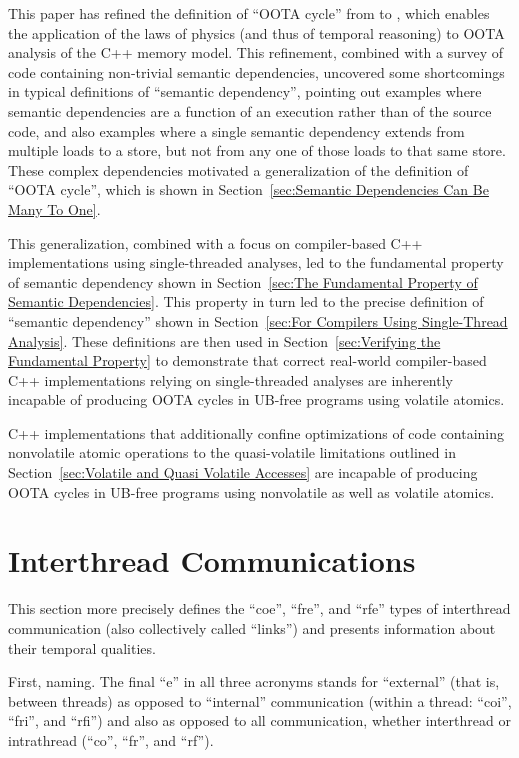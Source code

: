 \documentclass[10]{article}
\begin{document}
This paper has refined the definition of ``OOTA cycle'' from
 to , which enables the
application of the laws of physics (and thus of temporal reasoning) to OOTA
analysis of the C++ memory model.
This refinement, combined with a survey of code containing non-trivial
semantic dependencies, uncovered some shortcomings in typical definitions of
``semantic dependency'', pointing out examples where semantic dependencies
are a function of an execution rather than of the source code, and also
examples where a single semantic dependency extends from multiple loads
to a store, but not from any one of those loads to that same store.
These complex dependencies motivated a generalization of the definition
of ``OOTA cycle'', which is shown in
Section~\ref{sec:Semantic Dependencies Can Be Many To One}.

This generalization, combined with a focus on compiler-based C++
implementations using single-threaded analyses, led to the fundamental
property of semantic dependency shown in
Section~\ref{sec:The Fundamental Property of Semantic Dependencies}.
This property in turn led to the precise definition of ``semantic
dependency'' shown in
Section~\ref{sec:For Compilers Using Single-Thread Analysis}.
These definitions are then used in
Section~\ref{sec:Verifying the Fundamental Property}
to demonstrate that correct real-world compiler-based C++
implementations relying on single-threaded analyses are inherently
incapable of producing OOTA cycles in UB-free programs using volatile
atomics.

C++ implementations that additionally confine optimizations of code
containing nonvolatile atomic operations to the quasi-volatile limitations
outlined in
Section~\ref{sec:Volatile and Quasi Volatile Accesses}
are incapable of producing OOTA cycles in UB-free programs using
nonvolatile as well as volatile atomics.

\clearpage
\appendix

\section{Interthread Communications}
\label{app:Interthread Communications}

This section more precisely defines the ``coe'', ``fre'', and ``rfe''
types of interthread communication (also collectively called ``links'')
and presents information about their temporal qualities.

First, naming.
The final ``e'' in all three acronyms stands for ``external'' (that
is, between threads) as opposed to ``internal'' communication (within
a thread: ``coi'', ``fri'', and ``rfi'') and also as opposed to all
communication, whether interthread or intrathread (``co'', ``fr'', and
``rf'').
\end{document}
